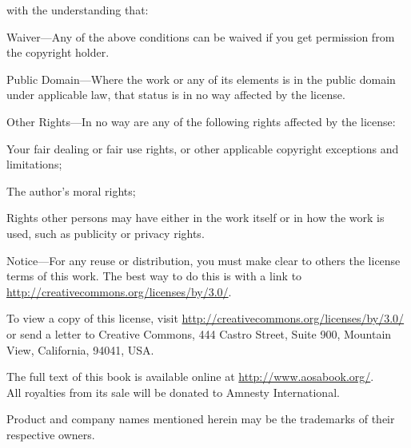 \noindent
with the understanding that:

\begin{aosaitemize}
  \item Waiver---Any of the above conditions can be waived if you get
    permission from the copyright holder.
  \item Public Domain---Where the work or any of its elements is in
    the public domain under applicable law, that status is in no way
    affected by the license.

  \item Other Rights---In no way are any of the following rights
    affected by the license:
    \begin{aosaitemize2}

      \item Your fair dealing or fair use rights, or other applicable
        copyright exceptions and limitations;

      \item The author's moral rights;

      \item Rights other persons may have either in the work itself or
        in how the work is used, such as publicity or privacy rights.

    \end{aosaitemize2}

  \item Notice---For any reuse or distribution, you must make clear to
    others the license terms of this work. The best way to do this is
    with a link to \url{http://creativecommons.org/licenses/by/3.0/}.

\end{aosaitemize}

\noindent To view a copy of this license, visit
\url{http://creativecommons.org/licenses/by/3.0/} or send a letter to Creative
Commons, 444 Castro Street, Suite 900, Mountain View, California,
94041, USA.\\

\vspace{0.15cm}

\noindent
The full text of this book is available online at \url{http://www.aosabook.org/}.\\
All royalties from its sale will be donated to Amnesty International.\\

\vfill

\noindent Product and company names mentioned herein may be the trademarks of
their respective owners.\\

